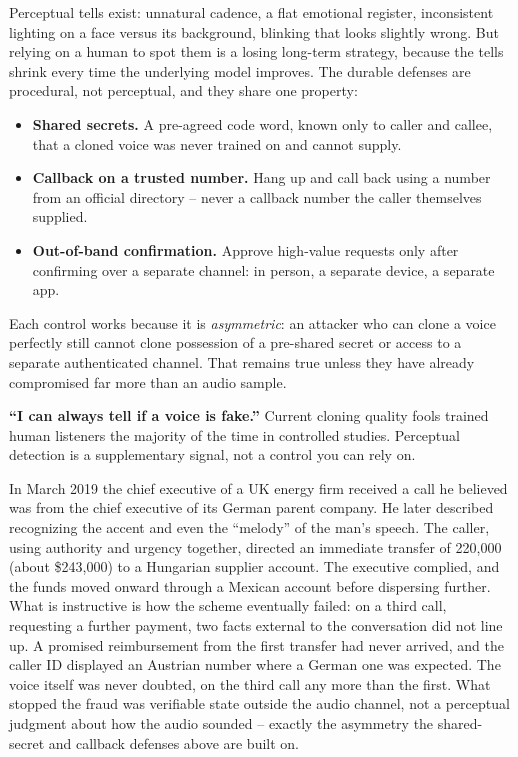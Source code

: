 Perceptual tells exist: unnatural cadence, a flat emotional register, inconsistent lighting on a
face versus its background, blinking that looks slightly wrong. But relying on a human to spot
them is a losing long-term strategy, because the tells shrink every time the underlying model
improves. The durable defenses are procedural, not perceptual, and they share one property:
\begin{itemize}
\item \textbf{Shared secrets.} A pre-agreed code word, known only to caller and callee, that a
cloned voice was never trained on and cannot supply.
\item \textbf{Callback on a trusted number.} Hang up and call back using a number from an official
directory -- never a callback number the caller themselves supplied.
\item \textbf{Out-of-band confirmation.} Approve high-value requests only after confirming over a
separate channel: in person, a separate device, a separate app.
\end{itemize}
Each control works because it is \emph{asymmetric}: an attacker who can clone a voice perfectly
still cannot clone possession of a pre-shared secret or access to a separate authenticated
channel. That remains true unless they have already compromised far more than an audio sample.

\begin{misconception}
\textbf{``I can always tell if a voice is fake.''} Current cloning quality fools trained human
listeners the majority of the time in controlled studies. Perceptual detection is a supplementary
signal, not a control you can rely on.
\end{misconception}

\begin{example}
In March 2019 the chief executive of a UK energy firm received a call he believed was from the
chief executive of its German parent company. He later described recognizing the accent and even
the ``melody'' of the man's speech. The caller, using authority and urgency
together, directed an immediate transfer of \texteuro{}220{,}000 (about \$243{,}000) to a Hungarian
supplier account. The executive complied, and the funds moved onward through a Mexican account
before dispersing further. What is instructive is how the scheme eventually failed: on a third
call, requesting a further payment, two facts external to the conversation did not line up. A
promised reimbursement from the first transfer had never arrived, and the caller ID displayed an
Austrian number where a German one was expected. The voice itself was never doubted, on the third
call any more than the first. What stopped the fraud was verifiable state outside the audio
channel, not a perceptual judgment about how the audio sounded -- exactly the asymmetry the
shared-secret and callback defenses above are built on.
\end{example}

